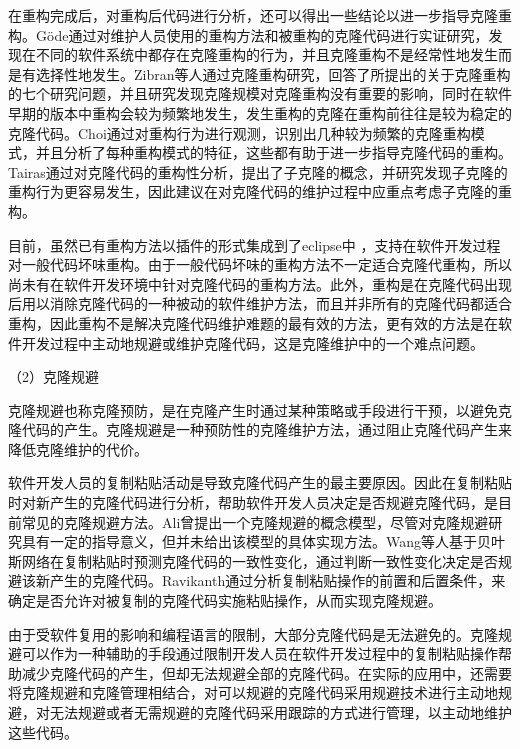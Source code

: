 在重构完成后，对重构后代码进行分析，还可以得出一些结论以进一步指导克隆重构。G{\"o}de通过对维护人员使用的重构方法和被重构的克隆代码进行实证研究，发现在不同的软件系统中都存在克隆重构的行为，并且克隆重构不是经常性地发生而是有选择性地发生\cite{gode2010clone}。Zibran等人通过克隆重构研究，回答了所提出的关于克隆重构的七个研究问题，并且研究发现克隆规模对克隆重构没有重要的影响，同时在软件早期的版本中重构会较为频繁地发生，发生重构的克隆在重构前往往是较为稳定的克隆代码\cite{zibran2013evaluating}。Choi通过对重构行为进行观测，识别出几种较为频繁的克隆重构模式，并且分析了每种重构模式的特征，这些都有助于进一步指导克隆代码的重构\cite{eunjong2014investigation}。Tairas通过对克隆代码的重构性分析，提出了子克隆的概念，并研究发现子克隆的重构行为更容易发生，因此建议在对克隆代码的维护过程中应重点考虑子克隆的重构\cite{tairas2010sub}。

目前，虽然已有重构方法以插件的形式集成到了eclipse中 ，支持在软件开发过程对一般代码坏味重构。由于一般代码坏味的重构方法不一定适合克隆代重构，所以尚未有在软件开发环境中针对克隆代码的重构方法。此外，重构是在克隆代码出现后用以消除克隆代码的一种被动的软件维护方法，而且并非所有的克隆代码都适合重构，因此重构不是解决克隆代码维护难题的最有效的方法，更有效的方法是在软件开发过程中主动地规避或维护克隆代码，这是克隆维护中的一个难点问题。

（2）克隆规避

克隆规避也称克隆预防，是在克隆产生时通过某种策略或手段进行干预，以避免克隆代码的产生。克隆规避是一种预防性的克隆维护方法，通过阻止克隆代码产生来降低克隆维护的代价。

软件开发人员的复制粘贴活动是导致克隆代码产生的最主要原因。因此在复制粘贴时对新产生的克隆代码进行分析，帮助软件开发人员决定是否规避克隆代码，是目前常见的克隆规避方法。Ali曾提出一个克隆规避的概念模型\cite{ali2013enhancing}，尽管对克隆规避研究具有一定的指导意义，但并未给出该模型的具体实现方法。Wang等人基于贝叶斯网络在复制粘贴时预测克隆代码的一致性变化，通过判断一致性变化决定是否规避该新产生的克隆代码\cite{wang2012can}\cite{wang2014predicting}。Ravikanth通过分析复制粘贴操作的前置和后置条件，来确定是否允许对被复制的克隆代码实施粘贴操作，从而实现克隆规避\cite{venkatasubramanyam2012method}。

由于受软件复用的影响和编程语言的限制，大部分克隆代码是无法避免的。克隆规避可以作为一种辅助的手段通过限制开发人员在软件开发过程中的复制粘贴操作帮助减少克隆代码的产生，但却无法规避全部的克隆代码。在实际的应用中，还需要将克隆规避和克隆管理相结合，对可以规避的克隆代码采用规避技术进行主动地规避，对无法规避或者无需规避的克隆代码采用跟踪的方式进行管理，以主动地维护这些代码。

